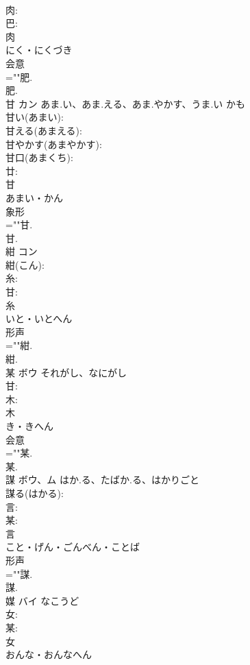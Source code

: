 \documentclass[8pt]{extreport}
\begin{document}
\begin{CJK}{UTF8}{min}
\\	肉: 
\\	巴: 
\\	肉	
\\	にく・にくづき	
\\	会意 
\\	=""肥.
\\	肥.
\\	甘	カン	あま.い、あま.える、あま.やかす、うま.い	かも	
\\	甘い(あまい): 
\\	甘える(あまえる): 
\\	甘やかす(あまやかす): 
\\	甘口(あまくち): 
\\	廿: 
\\	甘	
\\	あまい・かん	
\\	象形 
\\	=""甘.
\\	甘.
\\	紺	コン			
\\	紺(こん): 
\\	糸: 
\\	甘: 
\\	糸	
\\	いと・いとへん	
\\	形声 
\\	=""紺.
\\	紺.
\\	某	ボウ	それがし、なにがし		
\\	甘: 
\\	木: 
\\	木	
\\	き・きへん	
\\	会意 
\\	=""某.
\\	某.
\\	謀	ボウ、ム	はか.る、たばか.る、はかりごと		
\\	謀る(はかる): 
\\	言: 
\\	某: 
\\	言	
\\	こと・げん・ごんべん・ことば	
\\	形声 
\\	=""謀.
\\	謀.
\\	媒	バイ	なこうど		
\\	女: 
\\	某: 
\\	女	
\\	おんな・おんなへん	

\end{CJK}
\end{document}
